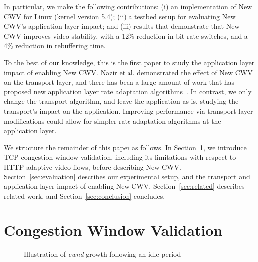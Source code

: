 \documentclass[10pt,sigconf]{acmart}
\begin{document}
In particular, we make the following contributions: (i) an implementation of New CWV for Linux (kernel version 5.4); (ii) a testbed setup for evaluating New CWV's application layer impact; and (iii) results that demonstrate that New CWV improves video stability, with a 12\% reduction in bit rate switches, and a 4\% reduction in rebuffering time.


To the best of our knowledge, this is the first paper to study the application
layer impact of enabling New CWV. 
Nazir et al. \cite{Nazir-2014-performance-evaluation-congestion-window-validation-dash-newcwv}
demonstrated the effect of New CWV on the transport layer, and there has been a large amount of work that has proposed new application layer rate adaptation algorithms~\cite{Mok-2012-qdash,Huang-2015-A-buffer-based-approach-to-rate-adaptation-bba, Yin-2015-a-control-theoritic-approach}. In contrast, we only change the transport algorithm, and leave the application as is, studying the transport's impact on the application. Improving performance via transport layer modifications could allow for simpler rate adaptation algorithms at the application layer.


We structure the remainder of this paper as follows. In Section~\ref{sec:background}, we introduce TCP congestion window validation, including its limitations with respect to HTTP adaptive video flows, before describing New CWV. Section~\ref{sec:evaluation} describes our experimental setup, and the transport and application layer impact of enabling New CWV. Section~\ref{sec:related} describes related work, and Section~\ref{sec:conclusion} concludes.

\section{Congestion Window Validation}
\label{sec:background}

\begin{figure}
  \centering
    \caption{Illustration of \emph{cwnd} growth following an idle period}
    \label{fig:cwnd-growth-after-idle}
\end{figure}
\end{document}
